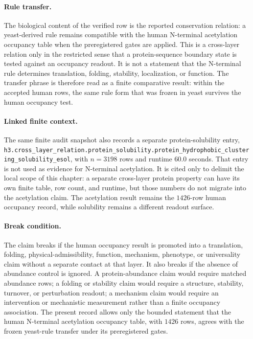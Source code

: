 \paragraph{Rule transfer.}
The biological content of the verified row is the reported conservation relation: a yeast-derived rule remains compatible with the human N-terminal acetylation occupancy table when the preregistered gates are applied. This is a cross-layer relation only in the restricted sense that a protein-sequence boundary state is tested against an occupancy readout. It is not a statement that the N-terminal rule determines translation, folding, stability, localization, or function. The transfer phrase is therefore read as a finite comparative result: within the accepted human rows, the same rule form that was frozen in yeast survives the human occupancy test.

\paragraph{Linked finite context.}
The same finite audit snapshot also records a separate protein-solubility entry, \texttt{h3.cross\_layer\_relation.protein\_solubility.protein\_hydrophobic\_clustering\_solubility\_esol}, with $n=3198$ rows and runtime $60.0$ seconds. That entry is not used as evidence for N-terminal acetylation. It is cited only to delimit the local scope of this chapter: a separate cross-layer protein property can have its own finite table, row count, and runtime, but those numbers do not migrate into the acetylation claim. The acetylation result remains the $1426$-row human occupancy record, while solubility remains a different readout surface.

\paragraph{Break condition.}
The claim breaks if the human occupancy result is promoted into a translation, folding, physical-admissibility, function, mechanism, phenotype, or universality claim without a separate contact at that layer. It also breaks if the absence of abundance control is ignored. A protein-abundance claim would require matched abundance rows; a folding or stability claim would require a structure, stability, turnover, or perturbation readout; a mechanism claim would require an intervention or mechanistic measurement rather than a finite occupancy association. The present record allows only the bounded statement that the human N-terminal acetylation occupancy table, with $1426$ rows, agrees with the frozen yeast-rule transfer under its preregistered gates.

